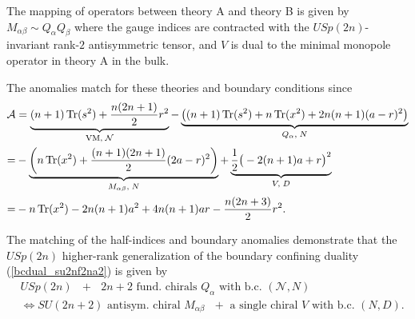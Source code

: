 \documentclass[12pt]{article}
\newcommand{\Acal}{\mathcal{A}}
\newcommand{\Ncal}{\mathcal{N}}
\DeclareMathOperator*{\Tr}{{\rm Tr}}
\numberwithin{equation}{section}
\begin{document}
The mapping of operators between theory A and theory B is given by
$M_{\alpha \beta} \sim Q_{\alpha} Q_{\beta}$ where the gauge indices are contracted with the $USp(2n)$-invariant rank-$2$ antisymmetric tensor, and $V$ is dual to the minimal monopole operator in theory A in the bulk. 

The anomalies match for these theories and boundary conditions since
\begin{align}
\label{bdy_USp2n_2np2_anom}
\Acal & = \underbrace{(n+1)\Tr(s^2) + \frac{n(2n+1)}{2}r^2}_{\textrm{VM}, \; \Ncal}
 - \underbrace{\left( (n+1)\Tr(s^2) + n\Tr(x^2) + 2n(n+1)(a-r)^2 \right)}_{Q_{\alpha}, \; N}
  \nonumber \\
  = & - \underbrace{\left( n \Tr(x^2) + \frac{(n+1)(2n+1)}{2}(2a-r)^2 \right)}_{M_{\alpha \beta}, \; N}
   + \underbrace{\frac{1}{2}\big( -2(n+1)a+r \big)^2}_{V, \; D}
  \nonumber \\
  = & - n \Tr(x^2) - 2n(n+1)a^2 + 4n(n+1)ar - \frac{n(2n+3)}{2}r^2.
\end{align}

The matching of the half-indices and boundary anomalies demonstrate that 
the $USp(2n)$ higher-rank generalization of the boundary confining duality (\ref{bcdual_su2nf2na2}) is given by
\begin{align}
\label{bcdual_USp2n_2n}
&\textrm{$USp(2n)$ $+$ $2n+2$ fund. chirals $Q_{\alpha}$ with b.c. $(\mathcal{N},N)$}
\nonumber\\
&\Leftrightarrow 
\textrm{
$SU(2n+2)$ antisym. chiral $M_{\alpha \beta}$ $+$ a single chiral $V$ with b.c. $(N,D)$}. 
\end{align}
\end{document}
